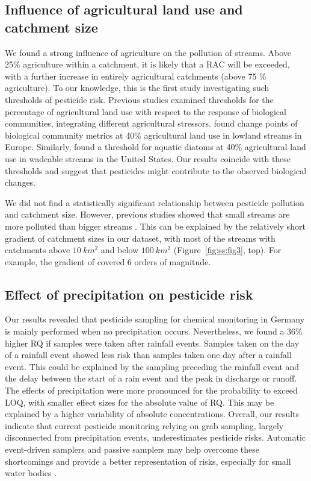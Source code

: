 \subsection{Influence of agricultural land use and catchment size}
We found a strong influence of agriculture on the pollution of streams.
Above 25\% agriculture within a catchment, it is likely that a RAC will be exceeded, with a further increase in entirely agricultural catchments (above 75 \% agriculture).
To our knowledge, this is the first study investigating such thresholds of pesticide risk.
Previous studies examined thresholds for the percentage of agricultural land use with respect to the response of biological communities, integrating different agricultural stressors.
\citet{feld_response_2013} found change points of biological community metrics at 40\% agricultural land use in lowland streams in Europe.
Similarly, \citet{waite_agricultural_2014} found a threshold for aquatic diatoms at 40\% agricultural land use in wadeable streams in the United States.
Our results coincide with these thresholds and suggest that pesticides might contribute to the observed biological changes. 

We did not find a statistically significant relationship between pesticide pollution and catchment size.
However, previous studies showed that small streams are more polluted than bigger streams \citep{schulz_field_2004,stehle_pesticide_2015,knauer_pesticides_2016}.
This can be explained by the relatively short gradient of catchment sizes in our dataset, with most of the streams with catchments above $10~km^2$ and below $100~km^2$ (Figure~\ref{fig:ss:fig3}, top).
For example, the gradient of \citet{schulz_field_2004} covered 6 orders of magnitude.


\subsection{Effect of precipitation on pesticide risk}
Our results revealed that pesticide sampling for chemical monitoring in Germany is mainly performed when no precipitation occurs. 
Nevertheless, we found a 36\% higher RQ if samples were taken after rainfall events. 
Samples taken on the day of a rainfall event showed less risk than samples taken one day after a rainfall event.
This could be explained by the sampling preceding the rainfall event and the delay between the start of a rain event and the peak in discharge or runoff. 
The effects of precipitation were more pronounced for the probability to exceed LOQ, with smaller effect sizes for the absolute value of RQ. 
This may be explained by a higher variability of absolute concentrations.
Overall, our results indicate that current pesticide monitoring relying on grab sampling, largely disconnected from precipitation events, underestimates pesticide risks.
Automatic event-driven samplers \citep{stehle_probabilistic_2013} and passive samplers \citep{fernandez_calibration_2014,moschet_evaluation_2015} may help overcome these shortcomings and provide a better representation of risks, especially for small water bodies \citep{lorenz_specifics_2016}. 

